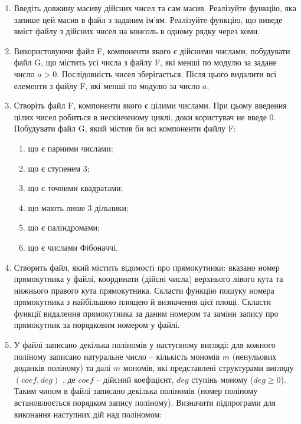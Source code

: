 \documentclass[a5paper,titlepage,openany,twoside,
]
{book_unv}%
\makeatletter
\newcommand{\xslalph}[1]{\expandafter\@xslalph\csname c@#1\endcsname}
\newcommand{\@xslalph}[1]{%
    \ifcase#1\or а\or б\or в\or г\or д\or e\or є\or ж\or з\or i%
    \or й\or к\or л\or м\or н\or о\or п\or р\or с\or т%
    \or у\or ф\or х\or ц\or ч\or ш\or ю\or я\or аа\or бб\or вв%
    \else\@ctrerr\fi%
}
\makeatother
\begin{document}
\begin{enumerate}
\def\labelenumi{\arabic{enumi})}

\item
Введіть довжину масиву дійсних чисел та сам масив. Реалізуйте функцію, яка 
запише цей масив в файл з заданим ім'ям. Реалізуйте функцію, що виведе вміст 
файлу з дійсних чисел на консоль в одному рядку через коми. 


\item
  Використовуючи файл F, компоненти якого є дійсними числами, побудувати
  файл G, що містить усі числа з файлу F, які менші по модулю за задане число $a>0$.
  Послідовність чисел зберігається. Після цього видалити всі елементи з файлу F, 
  які менші по модулю за число $a$.

\item
  Створіть файл F, компоненти якого є цілими числами. При цьому введення
цілих чисел робиться в нескінченому циклі, доки користувач не введе 0. 
 Побудувати файл G, який містив би всі компоненти файлу F:
\begin{enumerate}[label=\xslalph*)]
\item
що є парними числами; 
\item
 що є ступенем 3;
\item
що є точними квадратами; 
\item
що мають лише 3 дільники; 
\item
що є паліндромами;
\item
що є числами Фібоначчі.
\end{enumerate}


\item
  Створить файл, який містить відомості про прямокутники: вказано номер
  прямокутника у файлі, координати (дійсні числа) верхнього лівого кута та
  нижнього правого кута прямокутника. Скласти функцію пошуку номера
  прямокутника з найбільшою площею й визначення цієї площі.
  Скласти функції видалення прямокутника за даним номером та 
заміни запису про прямокутник за порядковим номером у файлі.

\item
  У файлі записано декілька поліномів у наступному вигляді:
для кожного поліному записано натуральне число -- кількість
мономів $m$ (ненульових доданків поліному) та далі $m$ мономів, які
представлені структурами вигляду $(coef, deg)$ , де $coef$ -- дійсний коефіцієнт,
$deg$ ступінь моному ($deg \ge 0$). 
Таким чином в файлі записано декілька поліномів (номер поліному встановлюється
порядком запису поліному).
Визначити підпрограми для виконання наступних дій над поліномом:


\end{enumerate}
\end{document}
